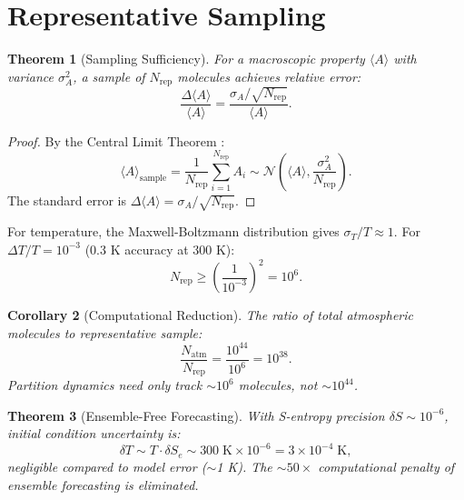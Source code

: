 \documentclass[twocolumn,10pt]{article}
\newtheorem{theorem}{Theorem}[section]
\newtheorem{corollary}[theorem]{Corollary}
\theoremstyle{definition}
\newcommand{\Se}{S_e}
\begin{document}
\section{Representative Sampling}\label{sec:sampling}

\begin{theorem}[Sampling Sufficiency]\label{thm:sampling}
For a macroscopic property $\langle A\rangle$ with variance $\sigma_A^2$, a sample of $N_{\mathrm{rep}}$ molecules achieves relative error:
\begin{equation}\label{eq:sampling_error}
    \frac{\Delta\langle A\rangle}{\langle A\rangle} = \frac{\sigma_A/\sqrt{N_{\mathrm{rep}}}}{\langle A\rangle}.
\end{equation}
\end{theorem}

\begin{proof}
By the Central Limit Theorem \citep{Feller1968}:
\begin{equation}
    \langle A\rangle_{\mathrm{sample}} = \frac{1}{N_{\mathrm{rep}}}\sum_{i=1}^{N_{\mathrm{rep}}} A_i \sim \mathcal{N}\left(\langle A\rangle, \frac{\sigma_A^2}{N_{\mathrm{rep}}}\right).
\end{equation}
The standard error is $\Delta\langle A\rangle = \sigma_A/\sqrt{N_{\mathrm{rep}}}$.
\end{proof}

For temperature, the Maxwell-Boltzmann distribution gives $\sigma_T/T \approx 1$. For $\Delta T/T = 10^{-3}$ (0.3 K accuracy at 300 K):
\begin{equation}\label{eq:N_rep}
    N_{\mathrm{rep}} \geq \left(\frac{1}{10^{-3}}\right)^2 = 10^6.
\end{equation}

\begin{corollary}[Computational Reduction]\label{cor:reduction}
The ratio of total atmospheric molecules to representative sample:
\begin{equation}\label{eq:comp_reduction}
    \frac{N_{\mathrm{atm}}}{N_{\mathrm{rep}}} = \frac{10^{44}}{10^6} = 10^{38}.
\end{equation}
Partition dynamics need only track $\sim 10^6$ molecules, not $\sim 10^{44}$.
\end{corollary}

\begin{theorem}[Ensemble-Free Forecasting]\label{thm:ensemble_free}
With S-entropy precision $\delta S \sim 10^{-6}$, initial condition uncertainty is:
\begin{equation}
    \delta T \sim T\cdot\delta\Se \sim 300\;\text{K}\times 10^{-6} = 3\times 10^{-4}\;\text{K},
\end{equation}
negligible compared to model error ($\sim$1 K). The ${\sim}50\times$ computational penalty of ensemble forecasting is eliminated.
\end{theorem}
\end{document}
